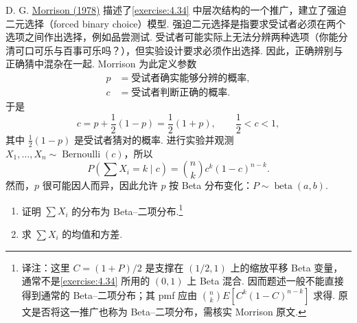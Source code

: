 \begin{exercise}\label{exercise:4.37}
D. G. \hyperref[bib:source226]{Morrison (1978)} 描述了\autoref{exercise:4.34} 中层次结构的一个推广，建立了强迫二元选择（forced binary choice）模型. 强迫二元选择是指要求受试者必须在两个选项之间作出选择，例如品尝测试. 受试者可能实际上无法分辨两种选项（你能分清可口可乐与百事可乐吗？），但实验设计要求必须作出选择. 因此，正确辨别与正确猜中混杂在一起. Morrison 为此定义参数
$$\begin{aligned}p&=\text{受试者确实能够分辨的概率},\\c&=\text{受试者判断正确的概率}.\end{aligned}$$
于是
$$c=p+\frac12(1-p)=\frac12(1+p),\qquad\frac12<c<1,$$
其中 $\frac12(1-p)$ 是受试者猜对的概率. 进行实验并观测 $X_1,\ldots,X_n\sim\operatorname{Bernoulli}(c)$，所以
$$P\left(\sum X_i=k\mid c\right)=\binom nk c^k(1-c)^{n-k}.$$
然而，$p$ 很可能因人而异，因此允许 $p$ 按 Beta 分布变化：$P\sim\operatorname{beta}(a,b)$.
\begin{enumerate}
\item[(a)] 证明 $\sum X_i$ 的分布为 Beta--二项分布.\footnote{译注：这里 $C=(1+P)/2$ 是支撑在 $(1/2,1)$ 上的缩放平移 Beta 变量，通常不是\autoref{exercise:4.34} 所用的 $(0,1)$ 上 Beta 混合. 因而题述一般不能直接得到通常的 Beta--二项分布；其 pmf 应由 $\binom nk E[C^k(1-C)^{n-k}]$ 求得. 原文是否将这一推广也称为 Beta--二项分布，需核实 Morrison 原文.}
\item[(b)] 求 $\sum X_i$ 的均值和方差.
\end{enumerate}
\end{exercise}
